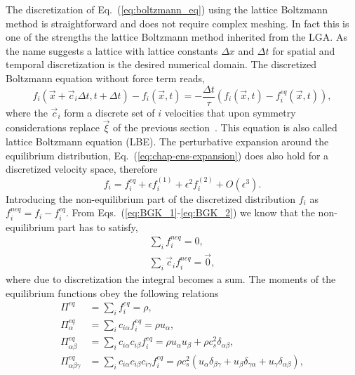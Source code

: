 The discretization of Eq.~(\ref{eq:boltzmann_eq}) using the lattice Boltzmann method is straightforward and does not require complex meshing.
In fact this is one of the strengths the lattice Boltzmann method inherited from the LGA.
As the name suggests a lattice with lattice constants $\Delta x$ and $\Delta t$ for spatial and temporal discretization is the desired numerical domain. 
The discretized Boltzmann equation without force term reads,
\begin{equation}\label{eq:LBM_discret_noforces}
    f_i(\vec{x}+\vec{c}_i\Delta t, t+ \Delta t) - f_i(\vec{x}, t) = -\frac{\Delta t}{\tau}(f_i(\vec{x}, t) - f^{eq}_i(\vec{x}, t)),
\end{equation}
where the $\vec{c}_{i}$ form a discrete set of $i$ velocities that upon symmetry considerations replace $\vec{\xi}$ of the previous section~\cite{rubinsteinTheoryLatticeBoltzmann2008}.
This equation is also called lattice Boltzmann equation (LBE). 
The perturbative expansion around the equilibrium distribution, Eq.~(\ref{eq:chap-ens-expansion}) does also hold for a discretized velocity space, therefore
\begin{equation}\label{eq:expansion_f}
    f_i = f_i^{eq} + \epsilon f_i^{(1)} + \epsilon^2 f_i^{(2)} + O(\epsilon^3).
\end{equation}
Introducing the non-equilibrium part of the discretized distribution $f_{i}$ as $f_i^{neq} = f_i - f_i^{eq}$. 
From Eqs.~(\ref{eq:BGK_1}-\ref{eq:BGK_2}) we know that the non-equilibrium part has to satisfy, 
\begin{align}\label{eq:non_constraint}
    \sum_i f_i^{neq} = 0, \\
    \sum_i \vec{c}_i f_i^{neq} = \vec{0}, 
\end{align}
where due to discretization the integral becomes a sum.
The moments of the equilibrium functions obey the following relations~\cite{chenLatticeBoltzmannMethod1998} 
\begin{align}
    \Pi^{eq} &= \sum_{i} f_{i}^{eq} = \rho, \label{eq:moments_equilibria_1}\\
    \Pi^{eq}_{\alpha} &= \sum_i c_{i\alpha}f_i^{eq} = \rho u_{\alpha}, \label{eq:moments_equilibria_2}\\
    \Pi^{eq}_{\alpha\beta} &= \sum_{i} c_{i\alpha} c_{i\beta}f_i^{eq} = \rho u_{\alpha} u_{\beta} + \rho c_s^2\delta_{\alpha\beta}, \label{eq:moments_equilibria_3}\\
    \Pi^{eq}_{\alpha\beta\gamma} &= \sum_i c_{i\alpha} c_{i\beta} c_{i\gamma}f_i^{eq} = \rho c_s^2(u_{\alpha}\delta_{\beta\gamma} + u_{\beta}\delta_{\gamma\alpha} + u_{\gamma}\delta_{\alpha\beta}), \label{eq:moments_equilibria_4}
\end{align}
